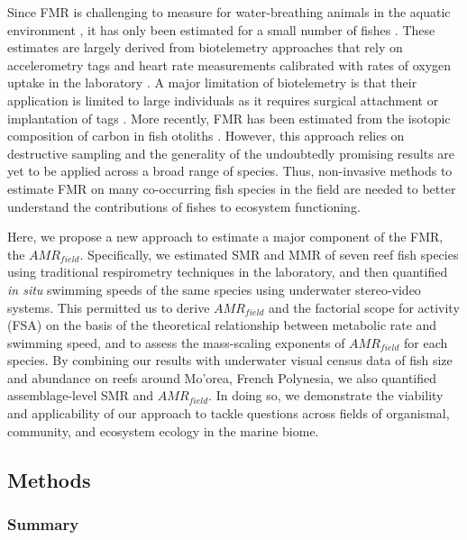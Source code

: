 \documentclass[
]{article}
\begin{document}
Since FMR is challenging to measure for water-breathing animals in the
aquatic environment \citep{Treberg2016}, it has only been estimated for
a small number of fishes
\citep[e.g.,][]{Lucas2011, Murchie2011, Cruz-Font2016, Chung2019}. These
estimates are largely derived from biotelemetry approaches that rely on
accelerometry tags and heart rate measurements calibrated with rates of
oxygen uptake in the laboratory \citep{Treberg2016, Grans2009}. A major
limitation of biotelemetry is that their application is limited to large
individuals as it requires surgical attachment or implantation of tags
\citep{Grans2009}. More recently, FMR has been estimated from the
isotopic composition of carbon in fish otoliths \citep{Chung2019}.
However, this approach relies on destructive sampling and the generality
of the undoubtedly promising results are yet to be applied across a
broad range of species. Thus, non-invasive methods to estimate FMR on
many co-occurring fish species in the field are needed to better
understand the contributions of fishes to ecosystem functioning.

Here, we propose a new approach to estimate a major component of the
FMR, the \(AMR_{field}\). Specifically, we estimated SMR and MMR of
seven reef fish species using traditional respirometry techniques in the
laboratory, and then quantified \emph{in situ} swimming speeds of the
same species using underwater stereo-video systems. This permitted us to
derive \(AMR_{field}\) and the factorial scope for activity (FSA) on the
basis of the theoretical relationship between metabolic rate and
swimming speed, and to assess the mass-scaling exponents of
\(AMR_{field}\) for each species. By combining our results with
underwater visual census data of fish size and abundance on reefs around
Mo'orea, French Polynesia, we also quantified assemblage-level SMR and
\(AMR_{field}\). In doing so, we demonstrate the viability and
applicability of our approach to tackle questions across fields of
organismal, community, and ecosystem ecology in the marine biome.

\newpage

\hypertarget{methods}{%
\subsection{Methods}\label{methods}}

\hypertarget{summary}{%
\subsubsection{Summary}\label{summary}}
\end{document}
